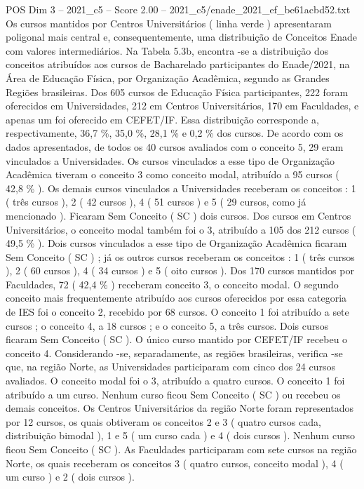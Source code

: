 \begin{textsample}{POS Dim 3 – 2021\_c5 – Score 2.00 – 2021\_c5/enade\_2021\_ef\_be61acbd52.txt}
Os cursos mantidos por Centros Universitários ( linha verde ) apresentaram poligonal mais central e, consequentemente, uma distribuição de Conceitos Enade com valores intermediários.
Na Tabela 5.3b, encontra -se a distribuição dos conceitos atribuídos aos cursos de Bacharelado participantes do Enade/2021, na Área de Educação Física, por Organização Acadêmica, segundo as Grandes Regiões brasileiras.
Dos 605 cursos de Educação Física participantes, 222 foram oferecidos em Universidades, 212 em Centros Universitários, 170 em Faculdades, e apenas um foi oferecido em CEFET/IF.
Essa distribuição corresponde a, respectivamente, 36,7 \%, 35,0 \%, 28,1 \% e 0,2 \% dos cursos.
De acordo com os dados apresentados, de todos os 40 cursos avaliados com o conceito 5, 29 eram vinculados a Universidades.
Os cursos vinculados a esse tipo de Organização Acadêmica tiveram o conceito 3 como conceito modal, atribuído a 95 cursos ( 42,8 \% ).
Os demais cursos vinculados a Universidades receberam os conceitos : 1 ( três cursos ), 2 ( 42 cursos ), 4 ( 51 cursos ) e 5 ( 29 cursos, como já mencionado ).
Ficaram Sem Conceito ( SC ) dois cursos.
Dos cursos em Centros Universitários, o conceito modal também foi o 3, atribuído a 105 dos 212 cursos ( 49,5 \% ).
Dois cursos vinculados a esse tipo de Organização Acadêmica ficaram Sem Conceito ( SC ) ; já os outros cursos receberam os conceitos : 1 ( três cursos ), 2 ( 60 cursos ), 4 ( 34 cursos ) e 5 ( oito cursos ).
Dos 170 cursos mantidos por Faculdades, 72 ( 42,4 \% ) receberam conceito 3, o conceito modal.
O segundo conceito mais frequentemente atribuído aos cursos oferecidos por essa categoria de IES foi o conceito 2, recebido por 68 cursos.
O conceito 1 foi atribuído a sete cursos ; o conceito 4, a 18 cursos ; e o conceito 5, a três cursos.
Dois cursos ficaram Sem Conceito ( SC ).
O único curso mantido por CEFET/IF recebeu o conceito 4.
Considerando -se, separadamente, as regiões brasileiras, verifica -se que, na região Norte, as Universidades participaram com cinco dos 24 cursos avaliados.
O conceito modal foi o 3, atribuído a quatro cursos.
O conceito 1 foi atribuído a um curso.
Nenhum curso ficou Sem Conceito ( SC ) ou recebeu os demais conceitos.
Os Centros Universitários da região Norte foram representados por 12 cursos, os quais obtiveram os conceitos 2 e 3 ( quatro cursos cada, distribuição bimodal ), 1 e 5 ( um curso cada ) e 4 ( dois cursos ).
Nenhum curso ficou Sem Conceito ( SC ).
As Faculdades participaram com sete cursos na região Norte, os quais receberam os conceitos 3 ( quatro cursos, conceito modal ), 4 ( um curso ) e 2 ( dois cursos ).

\end{textsample}
